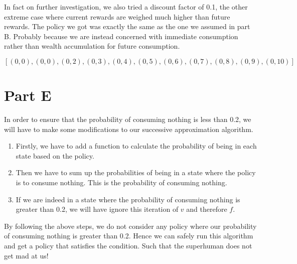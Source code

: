 \documentclass[12pt]{article}
\begin{document}
In fact on further investigation, we also tried a discount factor of 0.1, the
other extreme case where current rewards are weighed much higher than future
rewards. The policy we got was exactly the same as the one we assumed in part
B. Probably because we are instead concerned with immediate consumption rather
than wealth accumulation for future consumption.

$$[(0, 0), (0, 0), (0, 2), (0, 3), (0, 4), (0, 5), (0, 6), (0, 7), (0, 8), (0, 9), (0, 10)]$$

\section{Part E}
In order to ensure that the probability of consuming nothing is less than 0.2,
we will have to make some modifications to our successive approximation
algorithm.

\begin{enumerate}
	\item Firstly, we have to add a function to calculate the probability of being in
	      each state based on the policy.
	\item Then we have to sum up the probabilities of being in a state where the policy
	      is to consume nothing. This is the probability of consuming nothing.
	\item If we are indeed in a state where the probability of consuming nothing is
	      greater than 0.2, we will have ignore this iteration of $v$ and therefore $f$.
\end{enumerate}

By following the above steps, we do not consider any policy where our
probability of consuming nothing is greater than 0.2. Hence we can safely run
this algorithm and get a policy that satisfies the condition. Such that the
superhuman does not get mad at us!
\end{document}
